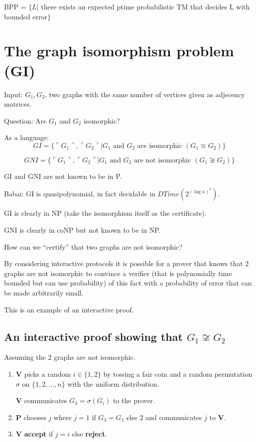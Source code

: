\documentclass[a4paper,12pt]{article}
\theoremstyle{definition}
\theoremstyle{remark}
\begin{document}
BPP = $\{L | $ there exists an expected ptime probabilistic TM that decides L with bounded error$\}$







\newpage

\section{The graph isomorphism problem (GI)}

Input: $G_1, G_2$, two graphs with the same number of vertices given as adjecency matrices.

Question: Are $G_1$ and $G_2$ isomorphic?

As a language:
\begin{equation*}
    GI = \{\ulcorner G_1 \urcorner, \ulcorner G_2 \urcorner | G_1 \text{ and } G_2 \text{ are isomorphic } (G_1 \cong G_2)\}
\end{equation*}

\begin{equation*}
    GNI = \{\ulcorner G_1 \urcorner, \ulcorner G_2 \urcorner | G_1 \text{ and } G_2 \text{ are not isomorphic } (G_1 \not \cong G_2)\}
\end{equation*}

GI and GNI are not known to be in P.

Babai: GI is quasipolynomial, in fact decidable in $DTime(2^{(\log n)^3})$.

GI is clearly in NP (take the isomorphism itself as the certificate).

GNI is clearly in coNP but not known to be in NP.

How can we ``certify'' that two graphs are not isomorphic?

By considering interactive protocols it is possible for a prover that knows that 2 graphs are not isomorphic to convince a verifier
(that is polynomially time bounded but can use probability) of this fact with a probability of error that can be made arbitrarily small.

This is an example of an interactive proof.

\subsection*{An interactive proof showing that $G_1 \not \cong G_2$}
Assuming the 2 graphs are not isomorphic.

\begin{enumerate}
    \item \textbf{V} picks a random $i \in \{1, 2\}$ by tossing a fair coin and a random permutation $\sigma$ on $\{1, 2, \dots, n\}$ with the uniform distribution.
        
    \textbf{V} communicates $G_3 = \sigma (G_i)$ to the prover.

    \item \textbf{P} chooses $j$ where $j = 1$ if $G_3 = G_1$ else $2$ and communicates $j$ to \textbf{V}.
    
    \item \textbf{V} \textbf{accept} if $j = i$ else \textbf{reject}.
\end{enumerate}
\end{document}
